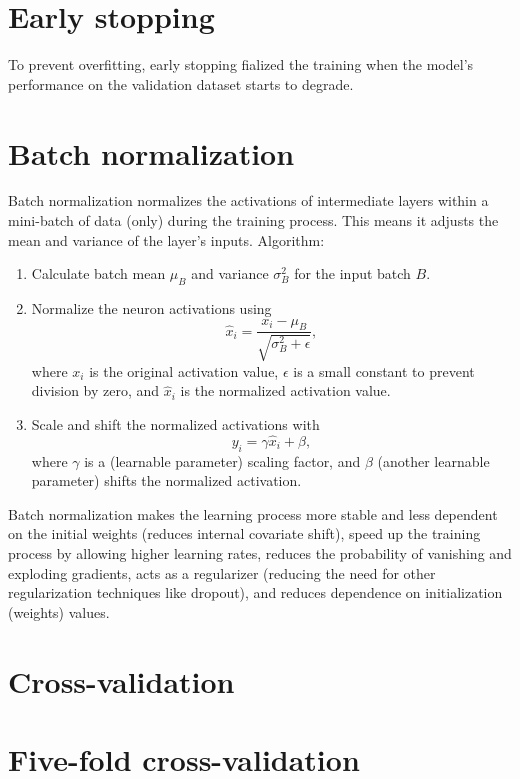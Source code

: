 \section{Early stopping}
To prevent overfitting, early stopping fialized the training when the
model's performance on the validation dataset starts to degrade.

\section{Batch normalization}
Batch normalization normalizes the activations of intermediate layers
within a mini-batch of data (only) during the training process. This
means it adjusts the mean and variance of the layer's
inputs. Algorithm:
\begin{enumerate}
\item Calculate batch mean $\mu_B$ and variance $\sigma^2_B$ for the input batch $B$.
\item Normalize the neuron activations using
  \begin{equation}
    \hat{x}_i = \frac{x_i-\mu_B}{\sqrt{\sigma^2_B+\epsilon}},
  \end{equation}
  where $x_i$ is the original  activation value, $\epsilon$ is a small
  constant  to  prevent  division  by zero,  and  $\hat{x}_i$  is  the
  normalized activation value.
\item Scale and shift the normalized activations with
  \begin{equation}
    y_i = \gamma\hat{x}_i+\beta,
  \end{equation}
  where $\gamma$ is a (learnable parameter) scaling factor, and
  $\beta$ (another learnable parameter) shifts the normalized
  activation.
\end{enumerate}

Batch normalization makes the learning process more stable and less
dependent on the initial weights (reduces internal covariate shift),
speed up the training process by allowing higher learning rates,
reduces the probability of vanishing and exploding gradients, acts as
a regularizer (reducing the need for other regularization techniques
like dropout), and reduces dependence on initialization (weights)
values.

\section{Cross-validation}

\section{Five-fold cross-validation}

